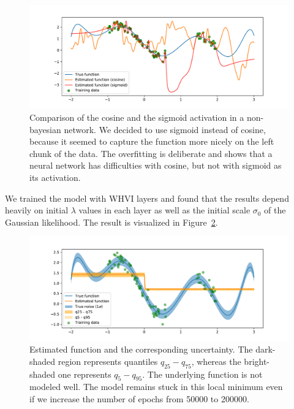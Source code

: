 \begin{figure}[htb]
    \centering
    \includegraphics[width=1.0\hsize]{img/toy-function-non-bayesian}
    \caption{
        Comparison of the cosine and the sigmoid activation in a non-bayesian network.
        We decided to use sigmoid instead of cosine, because it seemed to capture the function more nicely on the left chunk of the data.
        The overfitting is deliberate and shows that a neural network has difficulties with cosine, but not with sigmoid as its activation.
    }
    \label{fig:toy-function-non-bayesian}
\end{figure}

We trained the model with WHVI layers and found that the results depend heavily on initial $\lambda$ values in each layer as well as the initial scale $\sigma_0$ of the Gaussian likelihood.
The result is visualized in Figure~\ref{fig:toy-function-whvi}.
\begin{figure}[htbp]
    \centering
    \includegraphics[width=1.0\hsize]{img/bayesian-fit-with-kl}
    \caption{
    Estimated function and the corresponding uncertainty.
    The dark-shaded region represents quantiles $q_{25}-q_{75}$, whereas the bright-shaded one represents $q_{5}-q_{95}$.
    The underlying function is not modeled well.
    The model remains stuck in this local minimum even if we increase the number of epochs from 50000 to 200000.}
    \label{fig:toy-function-whvi}
\end{figure}

